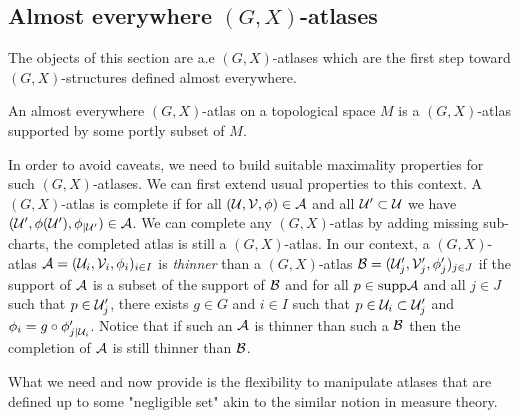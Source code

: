 \subsection{Almost everywhere $(G,X)$-atlases}



The objects of this section are a.e $(G,X)$-atlases which are the first step toward $(G,X)$-structures defined almost everywhere. 
\begin{defi} An almost everywhere $(G,X)$-atlas on a topological space $M$ is a $(G,X)$-atlas supported by some portly subset of $M$. 
\end{defi}
In order to avoid caveats, we need to build suitable maximality properties for such $(G,X)$-atlases.  We can first extend usual properties to this context.
A  $(G,X)$-atlas is complete if for all $(\mathcal{U},\mathcal V,\phi)\in\mathcal A$ and all $\mathcal{U}'\subset \mathcal{U}$ we have $ (\mathcal{U}',\phi(\mathcal{U}'),\phi_{|\mathcal{U}'}) \in \mathcal A$. We can complete any $(G,X)$-atlas by adding missing sub-charts, the completed atlas is still a $(G,X)$-atlas.
In our context, a $(G,X)$-atlas $\mathcal A = (\mathcal{U}_i,\mathcal V_i,\phi_i)_{i\in I}$ is {\it thinner} than a $(G,X)$-atlas $\mathcal B = (\mathcal{U}_j',\mathcal V_j',\phi_j')_{j\in J}$ if the support of $\mathcal A$ is a subset of the support of $\mathcal B$ and  for all $p\in \mathrm{supp} \mathcal A$ and all  $j\in J$ such that $p\in \mathcal{U}_j'$, there exists $g\in G$ and $i\in I$ such that $p\in \mathcal{U}_i\subset \mathcal{U}_j'$ and $\phi_{i} = g\circ \phi_{j|\mathcal{U}_i}'$. Notice that if such an $\mathcal A$ is thinner than such a $\mathcal B$ then the completion of $\mathcal A$ is still thinner than $\mathcal B$.

What we need and now provide is the flexibility to manipulate atlases that are defined up to some "negligible set" akin to the similar notion in measure theory. 



